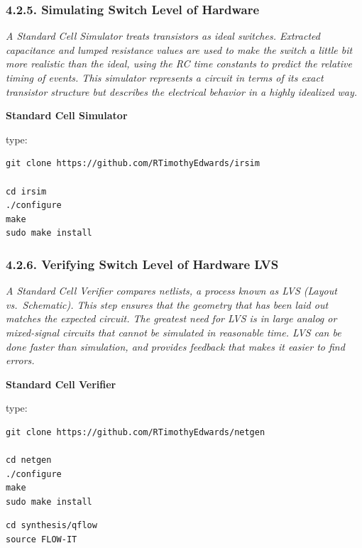 \documentclass[
]{article}
\begin{document}
\hypertarget{simulating-switch-level-of-hardware}{%
\subsubsection{4.2.5. Simulating Switch Level of
Hardware}\label{simulating-switch-level-of-hardware}}

\emph{A Standard Cell Simulator treats transistors as ideal switches.
Extracted capacitance and lumped resistance values are used to make the
switch a little bit more realistic than the ideal, using the RC time
constants to predict the relative timing of events. This simulator
represents a circuit in terms of its exact transistor structure but
describes the electrical behavior in a highly idealized way.}

\textbf{Standard Cell Simulator}

type:

\begin{verbatim}
git clone https://github.com/RTimothyEdwards/irsim

cd irsim
./configure
make
sudo make install
\end{verbatim}

\hypertarget{verifying-switch-level-of-hardware-lvs}{%
\subsubsection{4.2.6. Verifying Switch Level of Hardware
LVS}\label{verifying-switch-level-of-hardware-lvs}}

\emph{A Standard Cell Verifier compares netlists, a process known as LVS
(Layout vs.~Schematic). This step ensures that the geometry that has
been laid out matches the expected circuit. The greatest need for LVS is
in large analog or mixed-signal circuits that cannot be simulated in
reasonable time. LVS can be done faster than simulation, and provides
feedback that makes it easier to find errors.}

\textbf{Standard Cell Verifier}

type:

\begin{verbatim}
git clone https://github.com/RTimothyEdwards/netgen

cd netgen
./configure
make
sudo make install
\end{verbatim}

\begin{verbatim}
cd synthesis/qflow
source FLOW-IT
\end{verbatim}
\end{document}
